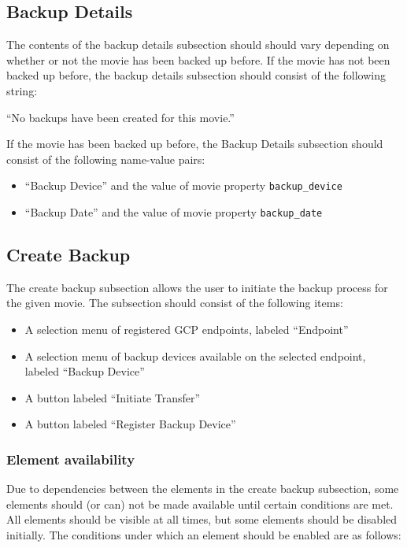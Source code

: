 \subsection{Backup Details}

The contents of the backup details subsection should should vary depending on 
whether or not the movie has been backed up before. If the movie has not been 
backed up before, the backup details subsection should consist of the following
string: 

\vspace{3mm}
``No backups have been created for this movie.''
\vspace{3mm}

\noindent If the movie has been backed up before, the Backup Details subsection
should consist of the following name-value pairs:

\begin{itemize}\itemsep1pt
  \item ``Backup Device'' and the value of movie property \texttt{backup\_device}
  \item ``Backup Date'' and the value of movie property \texttt{backup\_date}
\end{itemize}

\subsection{Create Backup}

The create backup subsection allows the user to initiate the backup process for
the given movie. The subsection should consist of the following items:

\begin{itemize}\itemsep1pt
  \item A selection menu of registered GCP endpoints, labeled ``Endpoint''
  \item A selection menu of backup devices available on the selected endpoint, labeled
  ``Backup Device''
  \item A button labeled ``Initiate Transfer''
  \item A button labeled ``Register Backup Device''
\end{itemize}

\subsubsection{Element availability} 

Due to dependencies between the elements in the create backup subsection, some elements
should (or can) not be made available until certain conditions are met. All elements 
should be visible at all times, but some elements should be disabled initially. The 
conditions under which an element should be enabled are as follows:

